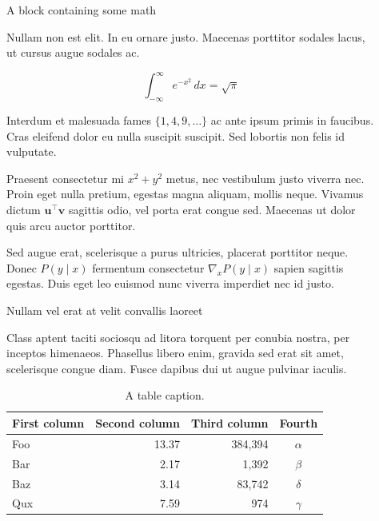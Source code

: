 \documentclass[final]{beamer}
\newlength{\sepwidth}
\newlength{\colwidth}
\newcommand{\separatorcolumn}{\begin{column}{\sepwidth}\end{column}}
\begin{document}
\begin{frame}[t]
\begin{columns}[t]
\begin{column}{\colwidth}
\end{column}

\separatorcolumn

\begin{column}{\colwidth}

  \begin{block}{A block containing some math}

    Nullam non est elit. In eu ornare justo. Maecenas porttitor sodales lacus,
    ut cursus augue sodales ac.

    $$
    \int_{-\infty}^{\infty} e^{-x^2}\,dx = \sqrt{\pi}
    $$

    Interdum et malesuada fames $\{1, 4, 9, \ldots\}$ ac ante ipsum primis in
    faucibus. Cras eleifend dolor eu nulla suscipit suscipit. Sed lobortis non
    felis id vulputate.


    Praesent consectetur mi $x^2 + y^2$ metus, nec vestibulum justo viverra
    nec. Proin eget nulla pretium, egestas magna aliquam, mollis neque. Vivamus
    dictum $\mathbf{u}^\intercal\mathbf{v}$ sagittis odio, vel porta erat
    congue sed. Maecenas ut dolor quis arcu auctor porttitor.


    Sed augue erat, scelerisque a purus ultricies, placerat porttitor neque.
    Donec $P(y \mid x)$ fermentum consectetur $\nabla_x P(y \mid x)$ sapien
    sagittis egestas. Duis eget leo euismod nunc viverra imperdiet nec id
    justo.

  \end{block}

  \begin{block}{Nullam vel erat at velit convallis laoreet}

    Class aptent taciti sociosqu ad litora torquent per conubia nostra, per
    inceptos himenaeos. Phasellus libero enim, gravida sed erat sit amet,
    scelerisque congue diam. Fusce dapibus dui ut augue pulvinar iaculis.

    \begin{table}
      \centering
      \begin{tabular}{l r r c}
        \toprule
        \textbf{First column} & \textbf{Second column} & \textbf{Third column} & \textbf{Fourth} \\
        \midrule
        Foo & 13.37 & 384,394 & $\alpha$ \\
        Bar & 2.17 & 1,392 & $\beta$ \\
        Baz & 3.14 & 83,742 & $\delta$ \\
        Qux & 7.59 & 974 & $\gamma$ \\
        \bottomrule
      \end{tabular}
      \caption{A table caption.}
    \end{table}


\end{block}
\end{column}
\end{columns}
\end{frame}
\end{document}
